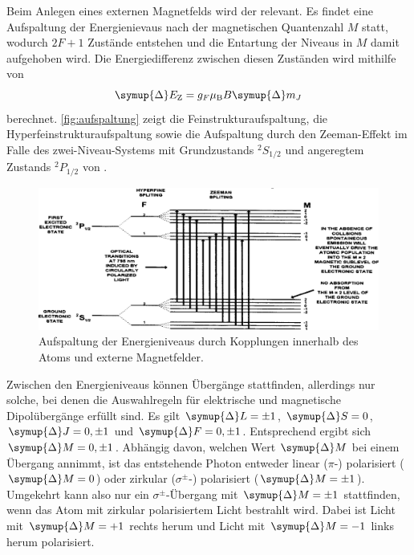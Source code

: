    Beim Anlegen eines externen Magnetfelds wird der  relevant.
    Es findet eine Aufspaltung der Energienievaus nach der magnetischen Quantenzahl $M$ statt,
    wodurch $2F+1$ Zustände entstehen und die Entartung der Niveaus in $M$ damit aufgehoben wird.
    Die Energiedifferenz zwischen diesen Zuständen wird mithilfe von
    \begin{equation}
        \symup{\Delta} E_\text{Z} = g_F \mu_\text{B} B \symup{\Delta} m_J
        \label{eqn:zeemanaufspaltung}
    \end{equation}
    berechnet.
    \autoref{fig:aufspaltung} zeigt die Feinstrukturaufspaltung,
    die Hyperfeinstrukturaufspaltung sowie die Aufspaltung durch den Zeeman-Effekt im Falle des zwei-Niveau-Systems mit Grundzustands $^2S_{1/2}$ und angeregtem Zustands $^2P_{1/2}$ von .
    \begin{figure}
        \centering
        \includegraphics[width=\textwidth]{content/img/Lit2_Abb_2D-3.png}
        \caption{Aufspaltung der Energieniveaus durch Kopplungen innerhalb des Atoms und externe Magnetfelder. \cite{caltech}}
        \label{fig:aufspaltung}
    \end{figure}
    Zwischen den Energieniveaus können Übergänge stattfinden,
    allerdings nur solche,
    bei denen die Auswahlregeln für elektrische und magnetische Dipolübergänge erfüllt sind.
    Es gilt $\symup{\Delta} L = \pm 1$, $\symup{\Delta} S = 0$, $\symup{\Delta} J = 0, \pm 1$ und $\symup{\Delta} F = 0, \pm 1$.
    Entsprechend ergibt sich $\symup{\Delta} M = 0, \pm 1$.
    Abhängig davon,
    welchen Wert $\symup{\Delta} M$ bei einem Übergang annimmt,
    ist das entstehende Photon entweder linear ($\pi$-) polarisiert ($\symup{\Delta}M = 0$) oder zirkular ($\sigma^{\pm}$-) polarisiert ($\symup{\Delta}M = \pm 1$).
    Umgekehrt kann also nur ein $\sigma^{\pm}$-Übergang mit $\symup{\Delta} M = \pm 1$ stattfinden,
    wenn das Atom mit zirkular polarisiertem Licht bestrahlt wird.
    Dabei ist Licht mit $\symup{\Delta} M = +1$ rechts herum und Licht mit $\symup{\Delta} M =-1$ links herum polarisiert.


